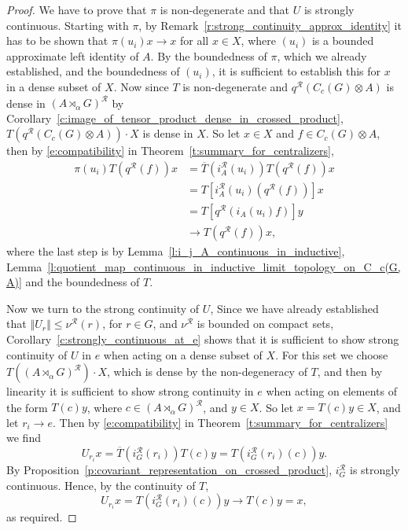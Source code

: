\documentclass{amsart}
\theoremstyle{plain}
\theoremstyle{definition}
\numberwithin{equation}{section}
\begin{document}
\begin{proof}
We have to prove that $\pi$ is non-degenerate and that $U$ is strongly continuous. Starting with $\pi$, by Remark~\ref{r:strong_continuity_approx_identity} it has to be shown that $\pi(u_i)x \to x$ for all $x \in X$, where $(u_i)$ is a bounded approximate left identity of $A$. By the boundedness of $\pi$, which we already established, and the boundedness of $(u_i)$, it is sufficient to establish this for $x$ in a dense subset of $X$. Now since $T$ is non-degenerate and ${q^{\mathcal R}}(C_c(G)\otimes A)$ is dense in ${(A {\rtimes}_\alpha G)^\mathcal{R}}$ by Corollary~\ref{c:image_of_tensor_product_dense_in_crossed_product}, $T({q^{\mathcal R}}(C_c(G)\otimes A))\cdot X$ is dense in $X$. So let $x \in X$ and $f \in C_c(G) \otimes A$, then by \eqref{e:compatibility} in Theorem~\ref{t:summary_for_centralizers},
\begin{align*}
\pi(u_i) T({q^{\mathcal R}}(f))x &= \overline{T}(i_A^{\mathcal R}(u_i))T({q^{\mathcal R}}(f))x\\
 &= T[i_A^{\mathcal R}(u_i)({q^{\mathcal R}}(f))]x \\
 &= T[{q^{\mathcal R}}(i_A(u_i)f)]y\\
 &\to T({q^{\mathcal R}}(f))x,
\end{align*}
where the last step is by Lemma~\ref{l:i_j_A_continuous_in_inductive}, Lemma~\ref{l:quotient_map_continuous_in_inductive_limit_topology_on_C_c(G,A)} and the boundedness of $T$.

Now we turn to the strong continuity of $U$, Since we have already established that ${\left\Vert {U_r} \right\Vert}\leq{\nu^{\mathcal R}}(r)$, for $r\in G$, and ${\nu^{\mathcal R}}$ is bounded on compact sets, Corollary~\ref{c:strongly_continuous_at_e} shows that it is sufficient to show strong continuity of $U$ in $e$ when acting on a dense subset of $X$. For this set we choose $T({(A {\rtimes}_\alpha G)^\mathcal{R}}) \cdot X$, which is dense by the non-degeneracy of $T$, and then by linearity it is sufficient to show strong continuity in $e$ when acting on elements of the form $T(c)y$, where $c \in {(A {\rtimes}_\alpha G)^\mathcal{R}}$, and $y\in X$. So let $x = T(c)y \in X$, and let $r_i\to e$.  Then by \eqref{e:compatibility} in Theorem~\ref{t:summary_for_centralizers} we find
\[
U_{r_i} x = \overline{T}(i_G^{\mathcal R}(r_i))T(c)y= T(i_G^{\mathcal R}(r_i)(c))y.
\]
By Proposition~\ref{p:covariant_representation_on_crossed_product}, $i_G^{\mathcal R}$ is strongly continuous. Hence, by the continuity of $T$,
\[
U_{r_i} x = T(i_G^{\mathcal R}(r_i)(c))y \to T(c)y=x,
\]
as required.


\end{proof}
\end{document}
